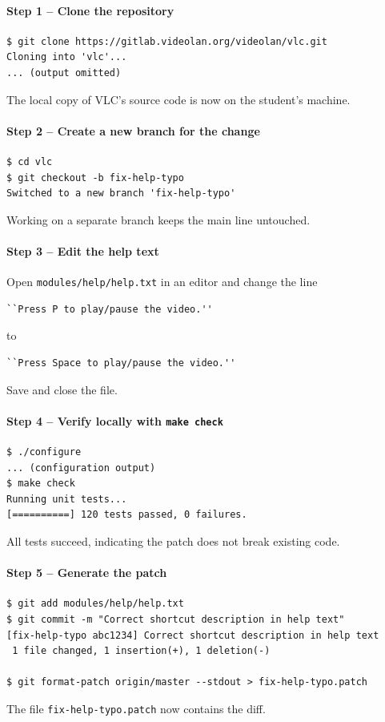 \documentclass[12pt, a4paper]{article}
\begin{document}
\paragraph{Step 1 -- Clone the repository}
\begin{verbatim}
$ git clone https://gitlab.videolan.org/videolan/vlc.git
Cloning into 'vlc'...
... (output omitted)
\end{verbatim}
The local copy of VLC's source code is now on the student's machine.

\paragraph{Step 2 -- Create a new branch for the change}
\begin{verbatim}
$ cd vlc
$ git checkout -b fix-help-typo
Switched to a new branch 'fix-help-typo'
\end{verbatim}
Working on a separate branch keeps the main line untouched.

\paragraph{Step 3 -- Edit the help text}
Open \texttt{modules/help/help.txt} in an editor and change the line
\begin{verbatim}
``Press P to play/pause the video.''
\end{verbatim}
to
\begin{verbatim}
``Press Space to play/pause the video.''
\end{verbatim}
Save and close the file.

\paragraph{Step 4 -- Verify locally with \texttt{make check}}
\begin{verbatim}
$ ./configure
... (configuration output)
$ make check
Running unit tests...
[==========] 120 tests passed, 0 failures.
\end{verbatim}
All tests succeed, indicating the patch does not break existing code.

\paragraph{Step 5 -- Generate the patch}
\begin{verbatim}
$ git add modules/help/help.txt
$ git commit -m "Correct shortcut description in help text"
[fix-help-typo abc1234] Correct shortcut description in help text
 1 file changed, 1 insertion(+), 1 deletion(-)

$ git format-patch origin/master --stdout > fix-help-typo.patch
\end{verbatim}
The file \texttt{fix-help-typo.patch} now contains the diff.
\end{document}
